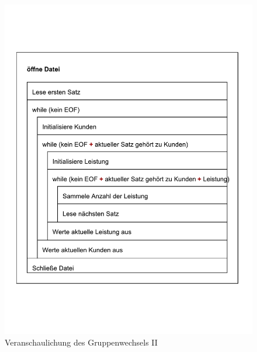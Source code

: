 \begin{figure}[!h]
    \centering
    \includegraphics[width=\textwidth,height=\textheight,keepaspectratio]{images/Gruppenwechsel-NSD.pdf}
    \caption{
        Veranschaulichung des Gruppenwechsels II
    }
    \label{fig:diagramm2}
\end{figure}

